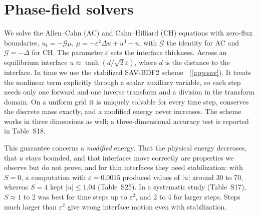 \documentclass[preprint,12pt]{elsarticle}
\theoremstyle{remark}
\begin{document}
\section{Phase-field solvers}\label{sec:pf}
We solve the Allen--Cahn (AC) and Cahn--Hilliard (CH) equations with zero-flux boundaries,
$u_t=-\mathcal G\mu$, $\mu=-\varepsilon^2\Delta u+u^3-u$, with $\mathcal G$ the identity for AC and $\mathcal G=-\Delta$
for CH. The parameter $\varepsilon$ sets the interface thickness. Across an equilibrium interface
$u\approx\tanh(d/\sqrt2\varepsilon)$, where $d$ is the distance to the interface. In time we use the
stabilized SAV-BDF2 scheme~\cite{shen2018scalar} (\ref{app:sav}). It treats the nonlinear term explicitly
through a scalar auxiliary variable, so each step needs only one forward and one inverse transform and a
division in the transform domain. On a uniform grid it is uniquely solvable for every time step, conserves
the discrete mass exactly, and a modified energy never increases. The scheme works in three dimensions as
well; a three-dimensional accuracy test is reported in Table~S18.

This guarantee concerns a \emph{modified} energy. That the physical energy decreases, that $u$ stays
bounded, and that interfaces move correctly are properties we observe but do not prove, and for thin
interfaces they need stabilization: with $S=0$, a computation with $\varepsilon=0.0015$ produced values of
$|u|$ around 30 to 70, whereas $S=4$ kept $|u|\le1.04$ (Table~S25). In a systematic study
(Table~S17), $S\approx1$ to 2 was best for time steps up to $\varepsilon^2$, and 2 to 4 for larger steps.
Steps much larger than $\varepsilon^2$ give wrong interface motion even with stabilization.

\end{document}
